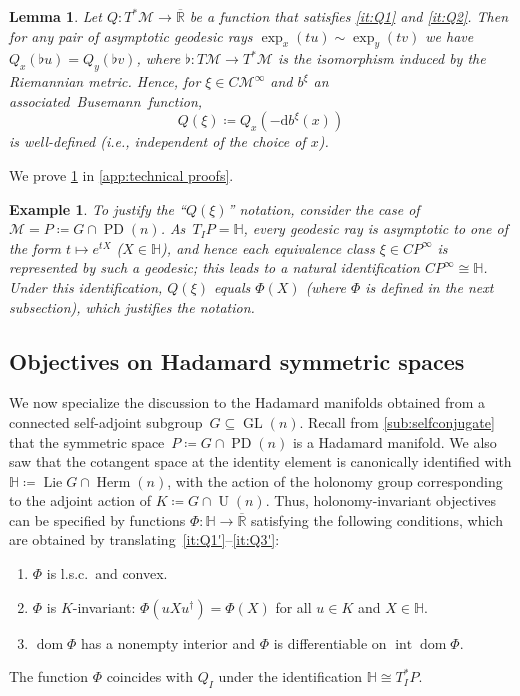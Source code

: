 \documentclass[11pt,letterpaper]{article}
\newtheorem{lemma}[theorem]{Lemma}\AddToHook{env/lemma/begin}{\crefalias{theorem}{lemma}}
\newtheorem{example}[theorem]{Example}\AddToHook{env/example/begin}{\crefalias{theorem}{example}}
\numberwithin{equation}{section}
\newcommand{\RR}{\mathbb{R}}
\newcommand{\bbH}{\mathbb{H}}
\newcommand{\diff}{\mathrm{d}}
\newcommand{\MM}{\mathcal{M}}
\DeclareMathOperator{\intr}{int}
\DeclareMathOperator{\dom}{dom}
\DeclareMathOperator{\PD}{PD}
\DeclareMathOperator{\U}{U}
\DeclareMathOperator{\GL}{GL}
\DeclareMathOperator{\Lie}{Lie}
\DeclareMathOperator{\Herm}{Herm}
\begin{document}
\begin{lemma}\label{lem:Q-busemann}
    Let $Q: T^*\MM \to \overline{\RR}$ be a function that satisfies \ref{it:Q1} and \ref{it:Q2}.
    Then for any pair of asymptotic geodesic rays $\exp_x(t u)\sim \exp_y(tv)$ we have $Q_x(\flat u)=Q_y(\flat v)$, where $\flat \colon T\MM \to T^*\MM$ is the isomorphism induced by the Riemannian metric.
    Hence, for $\xi\in C\MM^\infty$ and $b^\xi$ an associated~Busemann~function,
    \begin{equation}\label{eq:Fxi}
        Q(\xi)\coloneqq Q_x(-\diff b^\xi(x))
    \end{equation}
    is well-defined (i.e., independent of the choice of $x$).
\end{lemma}

\noindent We prove \cref{lem:Q-busemann} in \cref{app:technical proofs}.

\begin{example}\label{ex:Q_xi}
To justify the ``$Q(\xi)$'' notation, consider the case of $\MM = P \coloneqq G \cap \PD(n)$.
As~$T_I P = \bbH$, every geodesic ray is asymptotic to one of the form $t \mapsto e^{tX}$ ($X \in \bbH$), and hence each equivalence class $\xi \in CP^\infty$ is represented by such a geodesic; this leads to a natural identification $CP^\infty \cong \bbH$.
Under this identification, $Q(\xi)$ equals $\Phi(X)$ (where $\Phi$ is defined in the next subsection), which justifies the notation.
\end{example}

\subsection{Objectives on Hadamard symmetric spaces}\label{sub:objective selfadjoint}
We now specialize the discussion to the Hadamard manifolds obtained from a connected self-adjoint subgroup~$G \subseteq \GL(n)$.
Recall from \cref{sub:selfconjugate} that the symmetric space~$P \coloneqq G\cap\PD(n)$ is a Hadamard manifold.
We also saw that the cotangent space at the identity element is canonically identified with $\bbH \coloneqq \Lie G \cap \Herm(n)$, with the action of the holonomy group corresponding to the adjoint action of $K \coloneqq G \cap \U(n)$.
Thus, holonomy-invariant objectives can be specified by functions $\Phi \colon \bbH \to \overline{\RR}$ satisfying the following conditions, which are obtained by translating~\ref{it:Q1'}--\ref{it:Q3'}:
\begin{enumerate}[leftmargin=4em,noitemsep,label={($\Phi$\arabic*)}]
    \item\label{it:Phi1} $\Phi$ is l.s.c.\ and convex.
    \item\label{it:Phi2} $\Phi$ is $K$-invariant: $\Phi(u X u^\dagger) = \Phi(X)$ for all $u \in K$ and $X \in \bbH$.
    \item\label{it:Phi3} $\dom\Phi$ has a nonempty interior and $\Phi$ is differentiable on $\intr\dom\Phi$.
\end{enumerate}
The function $\Phi$ coincides with $Q_I$ under the identification $\bbH \cong T^*_I P$.
\end{document}
